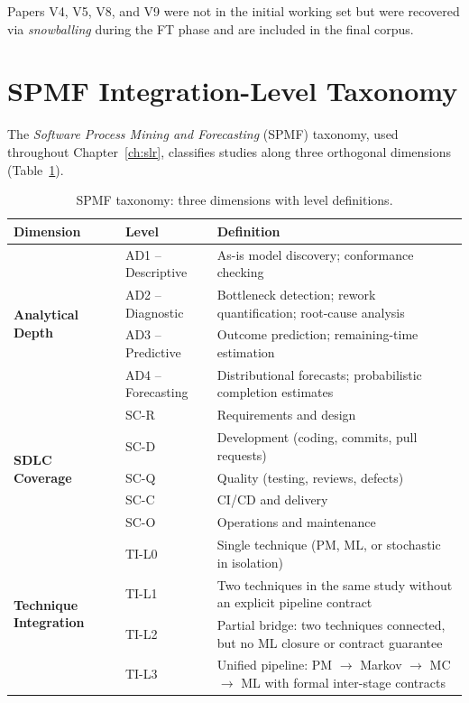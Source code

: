 Papers V4, V5, V8, and V9 were not in the initial working set but were
recovered via \textit{snowballing} during the FT phase and are included in
the final corpus.

\section{SPMF Integration-Level Taxonomy}
\label{app:slr-spmf}

The \textit{Software Process Mining and Forecasting} (SPMF) taxonomy, used
throughout Chapter~\ref{ch:slr}, classifies studies along three orthogonal
dimensions (Table~\ref{tab:app-spmf}).

\begin{table}[htbp]
\centering
\caption{SPMF taxonomy: three dimensions with level definitions.}
\label{tab:app-spmf}
\small
\setlength{\tabcolsep}{4pt}
\begin{tabular}{l l p{8.0cm}}
\toprule
\textbf{Dimension} & \textbf{Level} & \textbf{Definition} \\
\midrule
\multirow{4}{*}{\textbf{Analytical Depth}}
  & AD1 -- Descriptive   & As-is model discovery; conformance checking \\
  & AD2 -- Diagnostic    & Bottleneck detection; rework quantification; root-cause analysis \\
  & AD3 -- Predictive    & Outcome prediction; remaining-time estimation \\
  & AD4 -- Forecasting   & Distributional forecasts; probabilistic completion estimates \\
\midrule
\multirow{5}{*}{\textbf{SDLC Coverage}}
  & SC-R & Requirements and design \\
  & SC-D & Development (coding, commits, pull requests) \\
  & SC-Q & Quality (testing, reviews, defects) \\
  & SC-C & CI/CD and delivery \\
  & SC-O & Operations and maintenance \\
\midrule
\multirow{4}{*}{\textbf{Technique Integration}}
  & TI-L0 & Single technique (PM, ML, or stochastic in isolation) \\
  & TI-L1 & Two techniques in the same study without an explicit pipeline contract \\
  & TI-L2 & Partial bridge: two techniques connected, but no ML closure or contract guarantee \\
  & TI-L3 & Unified pipeline: PM $\rightarrow$ Markov $\rightarrow$ MC $\rightarrow$ ML
             with formal inter-stage contracts \\
\bottomrule
\end{tabular}
\end{table}

